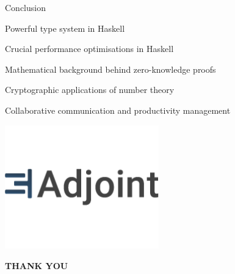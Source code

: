 \documentclass[11pt]{beamer}
\begin{document}
\begin{frame}{Conclusion}

\pause

Powerful type system in Haskell

\pause

\vspace{1cm}

Crucial performance optimisations in Haskell

\pause

\vspace{1cm}

Mathematical background behind zero-knowledge proofs

\pause

\vspace{1cm}

Cryptographic applications of number theory

\pause

\vspace{1cm}

Collaborative communication and productivity management

\end{frame}

\begin{frame}

\begin{center}

\includegraphics[width=0.5\textwidth]{adjoint.png}

\textbf{\Huge THANK YOU}

\end{center}
    
\end{frame}
\end{document}
